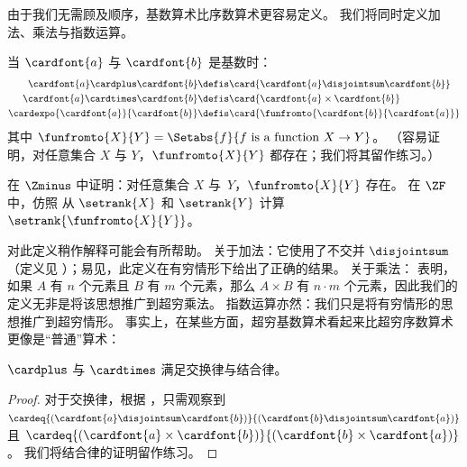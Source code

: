 \documentclass[../../../include/open-logic-section]{subfiles}
\begin{document}

由于我们无需顾及顺序，基数算术比序数算术更容易定义。
我们将同时定义加法、乘法与指数运算。


\begin{defn}
当 $\cardfont{a}$ 与 $\cardfont{b}$ 是基数时：
\begin{align*}
	\cardfont{a} \cardplus \cardfont{b} &\defis
	\card{\cardfont{a} \disjointsum \cardfont{b}}\\
	\cardfont{a} \cardtimes \cardfont{b} &\defis
	\card{\cardfont{a} \times \cardfont{b}}\\
	\cardexpo{\cardfont{a}}{\cardfont{b}} &\defis
	\card{\funfromto{\cardfont{b}}{\cardfont{a}}}
\end{align*}
其中 $\funfromto{X}{Y} = \Setabs{f}{f \text{ is a function } X \to Y}$。
（容易证明，对任意集合 $X$ 与 $Y$，$\funfromto{X}{Y}$ 都存在；我们将其留作练习。）
\end{defn}

\begin{prob}
在 $\Zminus$ 中证明：对任意集合 $X$ 与~$Y$，$\funfromto{X}{Y}$ 存在。
在 $\ZF$ 中，仿照  从 $\setrank{X}$ 和 $\setrank{Y}$ 计算 $\setrank{\funfromto{X}{Y}}$。
\end{prob}



对此定义稍作解释可能会有所帮助。
关于加法：它使用了不交并 $\disjointsum$（定义见 ）；易见，此定义在有穷情形下给出了正确的结果。
关于乘法： 表明，如果 $A$ 有 $n$ 个元素且 $B$ 有 $m$ 个元素，那么 $A \times B$ 有 $n \cdot m$ 个元素，因此我们的定义无非是将该思想推广到超穷乘法。
指数运算亦然：我们只是将有穷情形的思想推广到超穷情形。
事实上，在某些方面，超穷基数算术看起来比超穷序数算术更像是“普通”算术：


\begin{prop}
$\cardplus$ 与 $\cardtimes$ 满足交换律与结合律。
\end{prop}

\begin{proof}
对于交换律，根据 ，只需观察到 $\cardeq{(\cardfont{a} \disjointsum
\cardfont{b})}{(\cardfont{b} \disjointsum \cardfont{a})}$ 且 $\cardeq{(\cardfont{a} \times \cardfont{b})}{(\cardfont{b} \times
\cardfont{a})}$。
我们将结合律的证明留作练习。
\end{proof}
\end{document}
